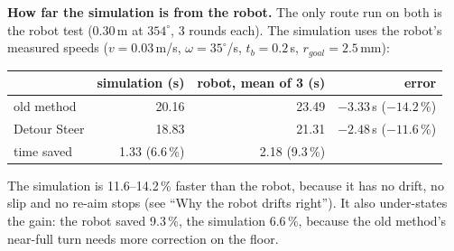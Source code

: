 \documentclass[11pt,a4paper]{article}
\begin{document}
{\medskip
\noindent\textbf{How far the simulation is from the robot.} The only route run on both is the robot test
(0.30\,m at $354^\circ$, 3 rounds each). The simulation uses the robot's measured speeds
($v = 0.03$\,m/s, $\omega = 35^\circ$/s, $t_b = 0.2$\,s, $r_{goal} = 2.5$\,mm):
\begin{center}
\begin{tabular}{lrrr}
\toprule
 & simulation (s) & robot, mean of 3 (s) & error \\
\midrule
old method   & 20.16 & 23.49 & $-3.33$\,s ($-14.2\,\%$) \\
Detour Steer & 18.83 & 21.31 & $-2.48$\,s ($-11.6\,\%$) \\
time saved   & 1.33 (6.6\,\%) & 2.18 (9.3\,\%) & \\
\bottomrule
\end{tabular}
\end{center}
The simulation is 11.6--14.2\,\% faster than the robot, because it has no drift, no slip and no re-aim
stops (see ``Why the robot drifts right''). It also under-states the gain: the robot saved 9.3\,\%, the
simulation 6.6\,\%, because the old method's near-full turn needs more correction on the floor.

}
\end{document}
